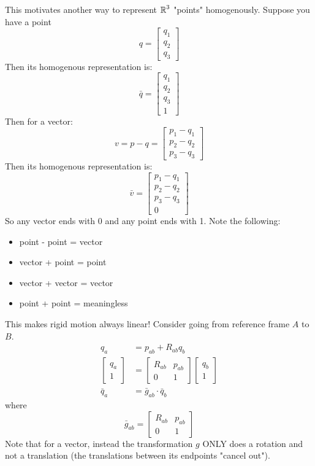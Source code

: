 This motivates another way to 
represent $\operatorname{\mathbb{R}}^3$ "points" homogenously. Suppose you have a point
\[ q = \begin{bmatrix}
    q_1 \\ q_2 \\ q_3
\end{bmatrix} \]
Then its homogenous representation is:
\[ \bar{q} = \begin{bmatrix}
    q_1 \\ q_2 \\ q_3 \\ 1
\end{bmatrix} \]
Then for a vector:
\[ v = p - q = \begin{bmatrix}
    p_1 - q_1 \\ p_2 - q_2 \\ p_3 - q_3
\end{bmatrix} \]
Then its homogenous representation is:
\[ \bar{v} = \begin{bmatrix}
    p_1 - q_1 \\ p_2 - q_2 \\ p_3 - q_3 \\ 0
\end{bmatrix} \]
So any vector ends with 0 and any point ends with 1.
Note the following:
\begin{itemize}
    \item point - point = vector
    \item vector + point = point
    \item vector + vector = vector
    \item point + point = meaningless
\end{itemize}
This makes rigid motion always linear! Consider going from reference frame $A$ to $B$.
\begin{align*}
    q_a &= p_{ab} +  R_{ab} q_b \\
    \begin{bmatrix} q_a \\ 1 \end{bmatrix} &= \begin{bmatrix} R_{ab} & p_{ab} \\ 0 & 1 \end{bmatrix} \begin{bmatrix} q_b \\ 1 \end{bmatrix} \\
    \bar{q}_a &= \bar{g}_{ab} \cdot \bar{q}_b
\end{align*}
where
\[ \bar{g}_{ab} = \begin{bmatrix}
    R_{ab} & p_{ab} \\ 0 & 1
\end{bmatrix} \]
Note that for a vector, instead the transformation $g$ ONLY does a rotation
and not a translation (the translations between its endpoints "cancel out").

